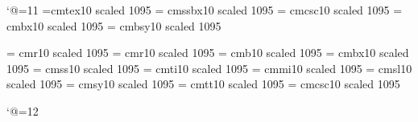 \catcode`@=11
\font\eleventex=cmtex10 scaled 1095
\font\elevenssb = cmssbx10 scaled 1095  %
\font\elevencsc = cmcsc10 scaled 1095 %
\font\elevenbfx = cmbx10 scaled 1095 %
\font\elevenbfy = cmbsy10 scaled 1095 %

\font\elevenrm= cmr10 scaled 1095
\font\elevenrmsca = cmr10 scaled 1095
\font\elevenbf = cmb10 scaled 1095
\font\elevenbfxsca = cmbx10 scaled 1095
\font\elevenss = cmss10 scaled 1095 
\font\elevenit = cmti10 scaled 1095
\font\eleveni = cmmi10 scaled 1095
\font\elevensl = cmsl10 scaled 1095
\font\elevensy = cmsy10 scaled 1095
\font\eleventt = cmtt10 scaled 1095
\font\elevensc = cmcsc10 scaled 1095
\let\sanss = \elevenss

\let\elevenex=\tenex


\def\elevenpoint{\def\pointsize{eleven}%
  \def\rm{\fam0\elevenrm}%
  \textfont0=\elevenrm \scriptfont0=\eightrm \scriptscriptfont0=\sixrm
  \textfont1=\eleveni \scriptfont1=\eighti \scriptscriptfont1=\sixi
  \textfont2=\elevensy \scriptfont2=\eightsy \scriptscriptfont2=\sixsy
  \textfont3=\elevenex \scriptfont3=\elevenex \scriptscriptfont3=\elevenex
  \def\it{\fam\itfam\elevenit}%
  \textfont\itfam=\elevenit
  \def\sl{\fam\slfam\elevensl}%
  \textfont\slfam=\elevensl
  \def\bf{\fam\bffam\elevenbf}%
  \textfont\bffam=\elevenbf \scriptfont\bffam=\eightbfx
   \scriptscriptfont\bffam=\sixbfx
  \def\tt{\fam\ttfam\eleventt}%
  \textfont\ttfam=\eleventt \scriptfont\ttfam=\tentt
  \tt \ttglue=.5em plus .25em minus .15em
  \normalbaselines\rm %
  \setstrut
  \ifd@ocsty \def\documentpointsize{eleven}%
              \let\footerfont=\elevenit
              \let\headerfont=\elevenit 
              \let\footnotefont = \ninepoint
              \let\smallerfont = \ninepoint
              \let\cheadfont = \eighteenrmsca
              \let\sheadfont=\fourteenbfxsca
              \let\ssheadfont=\elevenbfxsca
              \let\sssheadfont=\elevenbfxsca
              \let\dsssheadfont=\elevenbfxsca
              \let\captionnumfont=\elevenbfxsca
              \let\captiontitlefont=\relax
              \let\captionbodyfont=\relax
              \let\eqnumfont=\rm
              \setspacings\fi
  \let\bigfont = \twelvermsca
  \let\biggfont = \fourteenrmsca
  \let\bigggfont = \eighteenrmsca
  \let\titlefont = \bigggfont
  \let\sc=\ninerm
  }
\catcode`@=12